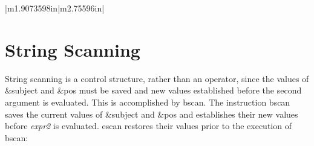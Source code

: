 \begin{center}
\tablelasttail{\hline}
\begin{xtabular}{|m{1.9073598in}|m{2.75596in}|}

\end{xtabular}
\end{center}


\section{String Scanning}

String scanning is a control structure, rather than an operator, since
the values of \&subject and \&pos must be saved and new values
established before the second argument is evaluated. This is
accomplished by bscan. The instruction bscan saves the current values
of \&subject and \&pos and establishes their new values before
\textit{expr2} is evaluated. escan restores their values prior to the
execution of bscan:


